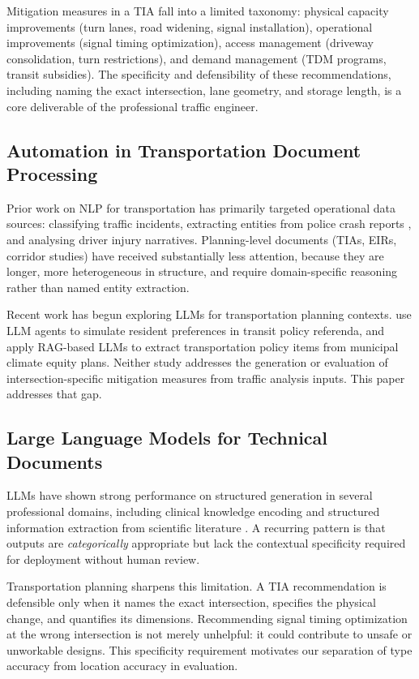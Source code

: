 \documentclass[preprint,12pt]{elsarticle}
\begin{document}
Mitigation measures in a TIA fall into a limited taxonomy: physical capacity
improvements (turn lanes, road widening, signal installation), operational
improvements (signal timing optimization), access management (driveway
consolidation, turn restrictions), and demand management (TDM programs,
transit subsidies).
The specificity and defensibility of these recommendations, including naming the
exact intersection, lane geometry, and storage length, is a core deliverable
of the professional traffic engineer.

\subsection{Automation in Transportation Document Processing}

Prior work on NLP for transportation has primarily targeted operational data
sources: classifying traffic incidents, extracting entities from police crash
reports \citep{zhang2020secondary}, and analysing driver injury narratives.
Planning-level documents (TIAs, EIRs, corridor studies) have received
substantially less attention, because they are longer, more heterogeneous
in structure, and require domain-specific reasoning rather than named
entity extraction.

Recent work has begun exploring LLMs for transportation planning contexts.
\citet{yan2025llm} use LLM agents to simulate resident preferences in
transit policy referenda, and \citet{choi2026climate} apply RAG-based LLMs
to extract transportation policy items from municipal climate equity plans.
Neither study addresses the generation or evaluation of intersection-specific
mitigation measures from traffic analysis inputs.
This paper addresses that gap.

\subsection{Large Language Models for Technical Documents}

LLMs have shown strong performance on structured generation in several
professional domains, including clinical knowledge encoding
\citep{MedicalLLM2023} and structured information extraction from scientific
literature \citep{ScienceLLM2023}.
A recurring pattern is that outputs are \emph{categorically} appropriate
but lack the contextual specificity required for deployment without
human review.

Transportation planning sharpens this limitation.
A TIA recommendation is defensible only when it names the exact intersection,
specifies the physical change, and quantifies its dimensions.
Recommending signal timing optimization at the wrong intersection is not
merely unhelpful: it could contribute to unsafe or unworkable designs.
This specificity requirement motivates our separation of type accuracy
from location accuracy in evaluation.
\end{document}
